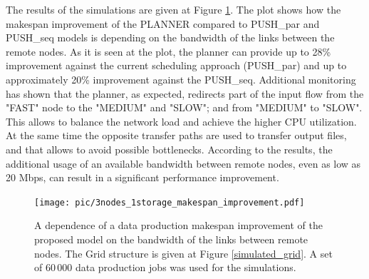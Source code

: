 \documentclass{svjour3}                     %
\begin{document}
The results of the simulations are given at Figure \ref{multi_makespan_compare}. The plot shows how the makespan improvement of the PLANNER compared to PUSH\_par and PUSH\_seq models is depending on the bandwidth of the links between the remote nodes. As it is seen at the plot, the planner can provide up to 28\% improvement against the current scheduling approach (PUSH\_par) and up to approximately 20\% improvement against the PUSH\_seq. Additional monitoring has shown that the planner, as expected, redirects part of the input flow from the "FAST" node to the "MEDIUM" and "SLOW"; and from "MEDIUM" to "SLOW". This allows to balance the network load and achieve the higher CPU utilization. At the same time the opposite transfer paths are used to transfer output files, and that allows to avoid possible bottlenecks. According to the results, the additional usage of an available bandwidth between remote nodes, even as low as 20 Mbps, can result in a significant performance improvement.
\begin{figure}
  \begin{center}
    \texttt{[image: pic/3nodes\_1storage\_makespan\_improvement.pdf]}
    \caption{A dependence of a data production makespan improvement of the proposed model on the bandwidth of the links between remote nodes. The Grid structure is given at Figure \ref{simulated_grid}.  A set of 60\,000 data production jobs was used for the simulations.}
      \label{multi_makespan_compare}	
  \end{center}  
\end{figure}
\end{document}
